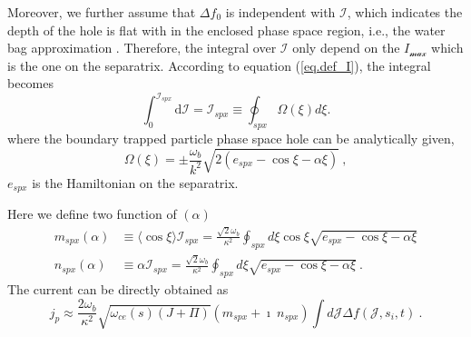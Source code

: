 Moreover, we further assume that $\Delta f_0$ is independent with $\mathcal{I}$, which indicates the depth of the hole is flat with in the enclosed phase space region, i.e., the water bag approximation \cite{omura_theory_2008,hezaveh2021}. Therefore, the integral over $\mathcal{I}$ only depend on the $I_\mathcal{max}$ which is the one on the separatrix. 
According to equation (\ref{eq.def_I}), the integral becomes
\begin{equation}
    \int^{\mathcal{I}_{s p x}}_0 \mathrm{d}\mathcal{I} = \mathcal{I}_{s p x} \equiv \oint_{s p x} \Omega (\xi) d \xi.
\end{equation}
where the boundary trapped particle phase space hole can be analytically given,
\begin{equation}
    \Omega(\xi) = \pm \frac{\omega_b}{k^2} \sqrt{2 (e_{spx}-\cos \xi - \alpha \xi)}~,
\end{equation}
$e_{spx}$ is the Hamiltonian on the separatrix.

Here we define two function of $(\alpha)$
\begin{equation}
    \begin{aligned}
        m_{spx}(\alpha) & \equiv \langle \cos \xi \rangle  \mathcal{I}_{spx} = \frac{\sqrt{2} \omega_b}{\kappa^2} \oint_{s p x} d \xi \cos \xi \sqrt{e_{s p x}-\cos \xi-\alpha \xi} \\
        n_{spx}(\alpha) & \equiv \alpha \mathcal{I}_{spx} = \frac{\sqrt{2} \omega_b}{\kappa^2} \oint_{s p x} d \xi \sqrt{e_{s p x}-\cos \xi-\alpha \xi} ~.
    \end{aligned}
\end{equation}
The current can be directly obtained as 
\begin{equation}\label{eq.adi_J}
    j_p \approx \frac{2 \omega_b}{\kappa^2} \sqrt{\omega_{c e}(s)(J+\Pi)}\left(m_{s p x}+\imath ~ n_{s p x}\right) \int d \mathcal{J} \Delta f(\mathcal{J},s_i,t) ~.
\end{equation}

